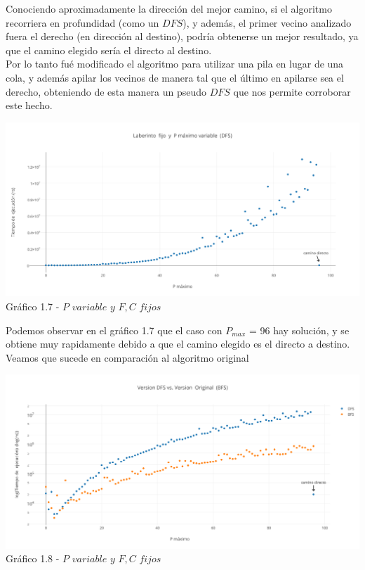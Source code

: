 Conociendo aproximadamente la dirección del mejor camino, si el algoritmo recorriera en profundidad (como un $DFS$), y además, el primer vecino analizado fuera el derecho (en dirección al destino), podría obtenerse un mejor resultado, ya que el camino elegido sería el directo al destino.\\ 
Por lo tanto fué modificado el algoritmo para utilizar una pila en lugar de una cola, y además apilar los vecinos de manera tal que el último en apilarse sea el derecho, obteniendo de esta manera un pseudo $DFS$ que nos permite corroborar este hecho.\\

  \begin{center}
\includegraphics[scale=0.6]{./EJ1/pVariableDfs.png}
{Gr\'afico 1.7 - $P$ $variable$ $y$ $F,C$ $fijos$}
  \end{center}
  \vspace*{0.3cm}

Podemos observar en el gráfico 1.7 que el caso con $P_{max}$ = 96 hay solución, y se obtiene muy rapidamente debido a que el camino elegido es el directo a destino. Veamos que sucede en comparación al algoritmo original

  \begin{center}
\includegraphics[scale=0.6]{./EJ1/bfsVsDfs.png}
{Gr\'afico 1.8 - $P$ $variable$ $y$ $F,C$ $fijos$}
  \end{center}
  \vspace*{0.3cm}
  
